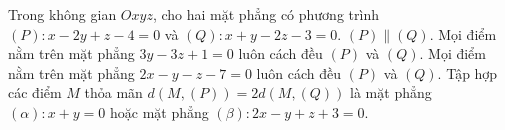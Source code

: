 \begin{ex}
Trong không gian $Oxyz$, cho hai mặt phẳng có phương trình $(P)\colon x-2y+z-4=0$ và $(Q)\colon x+y-2z-3=0$.
\choiceTF
{$(P)\parallel(Q)$.}
{\True Mọi điểm nằm trên mặt phẳng $3y-3z+1=0$ luôn cách đều $(P)$ và $(Q)$.}
{\True Mọi điểm nằm trên mặt phẳng $2x-y-z-7=0$ luôn cách đều $(P)$ và $(Q)$.}
{Tập hợp các điểm $M$ thỏa mãn $d\left(M,(P)\right)=2d\left(M,(Q)\right)$ là mặt phẳng $(\alpha)\colon x+y=0$ hoặc mặt phẳng $(\beta)\colon 2x-y+z+3=0$.}
\end{ex}
